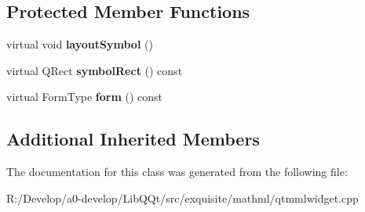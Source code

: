 \subsection*{Protected Member Functions}
\begin{DoxyCompactItemize}
\item 
\mbox{\label{class_mml_mo_node_a459fb3a8d25994ad1737442824ad4c97}} 
virtual void {\bfseries layout\+Symbol} ()
\item 
\mbox{\label{class_mml_mo_node_af744365011f04ba86a5e90ed8063e6bd}} 
virtual Q\+Rect {\bfseries symbol\+Rect} () const
\item 
\mbox{\label{class_mml_mo_node_a62c91990c6a4f70df29d115731d72605}} 
virtual Form\+Type {\bfseries form} () const
\end{DoxyCompactItemize}
\subsection*{Additional Inherited Members}


The documentation for this class was generated from the following file\+:\begin{DoxyCompactItemize}
\item 
R\+:/\+Develop/a0-\/develop/\+Lib\+Q\+Qt/src/exquisite/mathml/qtmmlwidget.\+cpp\end{DoxyCompactItemize}
